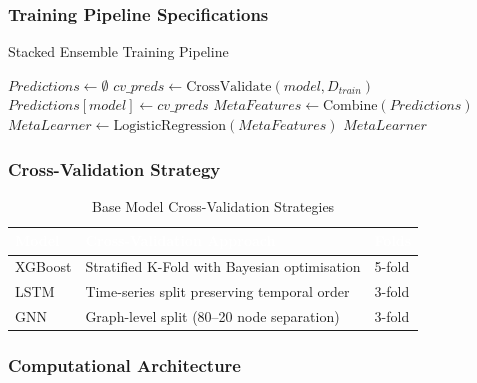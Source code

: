 \documentclass[12pt,a4paper,oneside]{report}
\numberwithin{equation}{chapter}
\renewcommand{\arraystretch}{1.6}
\begin{document}
\subsubsection{Training Pipeline Specifications}

\begin{algorithm}[H]
\caption{Stacked Ensemble Training Pipeline}
\label{alg:ensemble-training}
\begin{algorithmic}[1]
\State $Predictions \gets \emptyset$
    \State $cv\_preds \gets \text{CrossValidate}(model, D_{train})$
    \State $Predictions[model] \gets cv\_preds$
\EndFor
\State $MetaFeatures \gets \text{Combine}(Predictions)$
\State $MetaLearner \gets \text{LogisticRegression}(MetaFeatures)$
\State \Return $MetaLearner$
\EndProcedure
\end{algorithmic}
\end{algorithm}

\subsubsection{Cross-Validation Strategy}

\begin{table}[H]
\centering
\caption{Base Model Cross-Validation Strategies}
\label{tab:cv-strategies}
\renewcommand{\arraystretch}{1.4}
\begin{tabular}{L{3cm} L{6cm} C{3cm}}
\toprule
{}
\textcolor{white}{\textbf{Model}} &
\textcolor{white}{\textbf{Cross-Validation Approach}} &
\textcolor{white}{\textbf{Folds}} \\
\midrule
{}
XGBoost & Stratified K-Fold with Bayesian optimisation & 5-fold \\
LSTM    & Time-series split preserving temporal order    & 3-fold \\
GNN     & Graph-level split (80--20 node separation)    & 3-fold \\
\bottomrule
\end{tabular}
\end{table}

\subsubsection{Computational Architecture}
\end{document}
